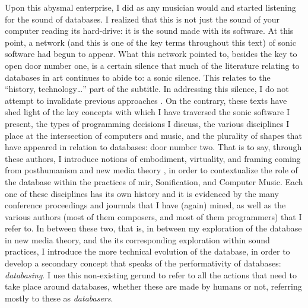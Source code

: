 Upon this abysmal enterprise, I did as any musician would and started listening for the sound of databases. I realized that this is not just the sound of your computer reading its hard-drive: it is the sound made with its software. At this point, a network (and this is one of the key terms throughout this text) of sonic software had begun to appear. What this network pointed to, besides the key to open door number one, is a certain silence that much of the literature relating to databases in art continues to abide to: a sonic silence. This relates to the ``history, technology\dots'' part of the subtitle. In addressing this silence, I do not attempt to invalidate previous approaches \parencites{Man01:The}{Ves07:Dat}. On the contrary, these texts have shed light of the key concepts with which I have traversed the sonic software I present, the types of programming decisions I discuss, the various disciplines I place at the intersection of computers and music, and the plurality of shapes that have appeared in relation to databases: door number two. That is to say, through these authors, I introduce notions of embodiment, virtuality, and framing coming from posthumanism \parencite{Hay99:How} and new media theory \parencite{Han04:New}, in order to contextualize the role of the database within the practices of \gls{mir}, Sonification, and Computer Music. Each one of these disciplines has its own history and it is evidenced by the many conference proceedings and journals that I have (again) mined, as well as the various authors (most of them composers, and most of them programmers) that I refer to. In between these two, that is, in between my exploration of the database in new media theory, and the its corresponding exploration within sound practices, I introduce the more technical evolution of the database, in order to develop a secondary concept that speaks of the performativity of databases: \textit{databasing}. I use this non-existing gerund to refer to all the actions that need to take place around databases, whether these are made by humans or not, referring mostly to these as \textit{databasers}.

